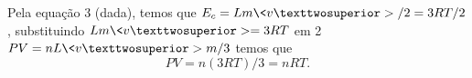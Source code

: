 \documentclass[border=5pt]{article}
\begin{document}
    Pela equação 3 (dada), temos que $E_c=Lm\<v²>/2=3RT/2$, substituindo
    $Lm\<v²>=3RT$ em 2 $PV=nL\<v²>m/3$ temos que
    \[ PV=n(3RT)/3=nRT. \]
\end{document}
